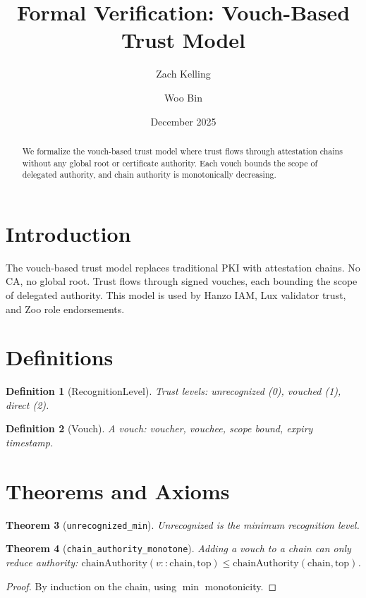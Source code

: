 \documentclass[11pt]{article}
\title{Formal Verification: Vouch-Based Trust Model}
\author{Zach Kelling \and Woo Bin}
\date{December 2025}
\newtheorem{theorem}{Theorem}
\newtheorem{definition}[theorem]{Definition}
\begin{document}
\maketitle

\begin{abstract}
We formalize the vouch-based trust model where trust flows through attestation chains without any global root or certificate authority. Each vouch bounds the scope of delegated authority, and chain authority is monotonically decreasing.
\end{abstract}

\section{Introduction}
The vouch-based trust model replaces traditional PKI with attestation chains. No CA, no global root. Trust flows through signed vouches, each bounding the scope of delegated authority. This model is used by Hanzo IAM, Lux validator trust, and Zoo role endorsements.

\section{Definitions}
\begin{definition}[RecognitionLevel]
Trust levels: unrecognized (0), vouched (1), direct (2).
\end{definition}

\begin{definition}[Vouch]
A vouch: voucher, vouchee, scope bound, expiry timestamp.
\end{definition}


\section{Theorems and Axioms}
\begin{theorem}[\texttt{unrecognized\_min}]
Unrecognized is the minimum recognition level.
\end{theorem}

\begin{theorem}[\texttt{chain\_authority\_monotone}]
Adding a vouch to a chain can only reduce authority: $\text{chainAuthority}(v :: \text{chain}, \text{top}) \leq \text{chainAuthority}(\text{chain}, \text{top})$.
\end{theorem}
\begin{proof}
By induction on the chain, using $\min$ monotonicity.
\end{proof}
\end{document}

